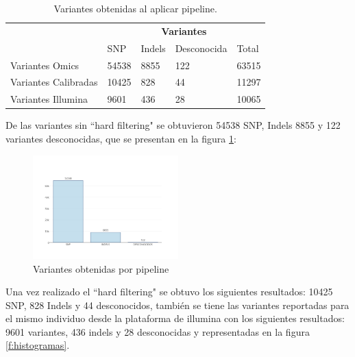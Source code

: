 \begin{table}[htb]
	\centering
	\begin{tabular}{|l|l|l|l|l|}
		\hline
		& \multicolumn{4}{c|}{\textbf{Variantes}} \\
		\cline{2-5} 
		& SNP  & Indels & Desconocida & Total \\ \cline{2-5}
		\hline 
		\multirow{1}{4cm}{Variantes Omics} & 54538 & 8855 & 122 & 63515 \\ \cline{2-5}
		\hline 
		\multirow{1}{4cm}{Variantes Calibradas} & 10425 & 828 & 44 & 11297 \\ \cline{2-5}
		\hline
		\multirow{1}{4cm}{Variantes Illumina} & 9601 & 436 & 28 & 10065 \\ \cline{2-5}
		\hline
	\end{tabular}
	\caption{Variantes obtenidas al aplicar pipeline. }
	\label{tabla:final}
\end{table}

De las variantes sin ``hard filtering" se obtuvieron 54538 SNP, Indels 8855 y 122 variantes desconocidas, que se presentan en la figura \ref{fig:omics}: 

\begin{figure}[H]
	\centering
	\includegraphics[width=0.5\textwidth]{Kap2/variantesomics}
	\caption{Variantes obtenidas por pipeline} \label{fig:omics}
\end{figure}

Una vez realizado el ``hard filtering" se obtuvo los siguientes resultados: 10425 SNP, 828 Indels y 44 desconocidos, también se tiene las variantes reportadas para el mismo individuo desde la plataforma de illumina con los siguientes resultados: 9601 variantes, 436 indels y 28 desconocidas y representadas en la figura \ref{f:histogramas}.

